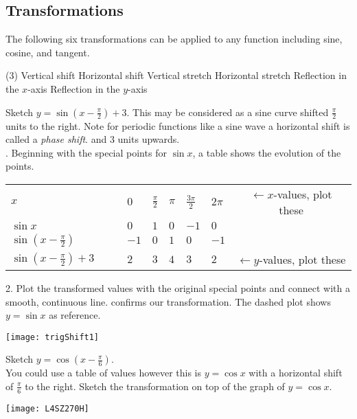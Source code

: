 \subsection*{Transformations}
The following six transformations can be applied to any function including sine, cosine, and tangent. 
\begin{tasks}[style=itemize](3)
\task Vertical shift 
\task Horizontal shift 
\task Vertical stretch 
\task Horizontal stretch 
\task Reflection in the $x$-axis 
\task Reflection in the $y$-axis 
\end{tasks}

\example Sketch $y =\sin  \left (x -\frac{\pi }{2}\right ) +3$. This may be considered as a sine curve shifted $\frac{\pi }{2}$ units to the right. Note for periodic functions like a sine wave a horizontal shift is called a \textit{phase shift}. and $3$ units upwards.\\ 
. Beginning with the special points for $\sin x$, a table shows the evolution of the points. \\
\begin{tabular}{llllllc}\cmidrule{1-6}
	$x$  & $0$  & $\frac{\pi }{2}$  & $\pi $  & $\frac{3 \pi }{2}$  & $2 \pi $ & $\leftarrow x$-values, plot these \\
	\cmidrule{1-6}
	$\sin  x$  & $0$  & $1$  & $0$  & $ -1$  & $0$ & \\
	\cmidrule{1-6}
	$\sin  \left (x -\frac{\pi }{2}\right )$  & $ -1$  & $0$  & $1$  & $0$  & $ -1$&  \\
	\cmidrule{1-6}
	$\sin  \left (x -\frac{\pi }{2}\right ) +3\qquad$  & $2$  & $3$  & $4$  & $3$  & $2$&$\leftarrow y$-values, plot these  \\
	\cmidrule{1-6}
\end{tabular}

2. Plot the transformed values with the original special points and connect with a smooth, continuous line. \Desmos confirms our transformation. The dashed plot shows $y=\sin x$ as reference.\\
\begin{center}
\texttt{[image: trigShift1]}
\end{center}


\example Sketch $y =\cos  (x -\frac{\pi }{6})$.\medskip\\
\solution You could use a table of values however this is $y =\cos  x$ with a horizontal shift of $\frac{\pi }{6}$ to the right. Sketch the transformation on top of the graph of $y =\cos  x $.
\begin{center}
\texttt{[image: L4SZ270H]}
\end{center}

